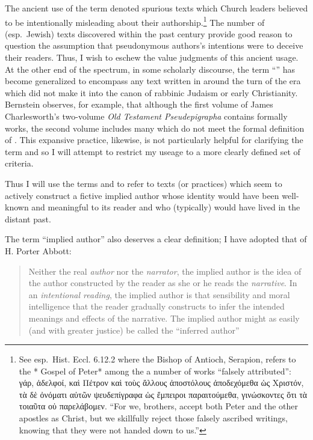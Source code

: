 The ancient use of the term \psa denoted spurious texts
which Church leaders believed to be intentionally misleading about their
authorship.\footnote{See esp.~Hist. Eccl. 6.12.2 where the Bishop of
  Antioch, Serapion, refers to the * Gospel of Peter* among the a number
  of works ``falsely attributed'': γάρ, ἀδελφοί, καὶ Πέτρον καὶ τοὺς
  ἄλλους ἀποστόλους ἀποδεχόμεθα ὡς Χριστόν, τὰ δὲ ὀνόματι αὐτῶν
  ψευδεπίγραφα ὡς ἔμπειροι παραιτούμεθα, γινώσκοντες ὅτι τὰ τοιαῦτα οὐ
  παρελάβομεν. ``For we, brothers, accept both Peter and the other
  apostles as Christ, but we skillfully reject those falsely ascribed
  writings, knowing that they were not handed down to us.''} The number
of (esp.~Jewish) \psgraphical texts discovered within
the past century provide good reason to question the assumption that
pseudonymous authors's intentions were to deceive their
readers.\autocites[53--58]{mroczek2016}[See also][]{reed_jts2009} Thus,
I wish to eschew the value judgments of this ancient usage. At the other
end of the spectrum, in some scholarly discourse, the term
``\psa'' has become generalized to encompass any text
written in around the turn of the era which did not make it into the
canon of rabbinic Judaism or early Christianity. Bernstein observes, for
example, that although the first volume of James Charlesworth's
two-volume \emph{Old Testament Pseudepigrapha} contains formally
\psgraphic works, the second volume includes many which
do not meet the formal definition of
\psa.\autocites[2]{bernstein_chazon-etal1999}{charlesworth_OTP}
This expansive practice, likewise, is not particularly helpful for
clarifying the term and so I will attempt to restrict my useage to a
more clearly defined set of criteria.

Thus I will use the terms \psy and \psa
to refer to texts (or practices) which seem to actively construct a
fictive implied author whose identity would have been well-known and
meaningful to its reader and who (typically) would have lived in the
distant past.

The term ``implied author'' also deserves a clear definition; I have
adopted that of H. Porter Abbott:

\begin{quote}
Neither the real \emph{author} nor the \emph{narrator}, the implied
author is the idea of the author constructed by the reader as she or he
reads the \emph{narrative}. In an \emph{intentional reading}, the
implied author is that sensibility and moral intelligence that the
reader gradually constructs to infer the intended meanings and effects
of the narrative. The implied author might as easily (and with greater
justice) be called the ``inferred author'' \autocite[235]{abbott2008}
\end{quote}

